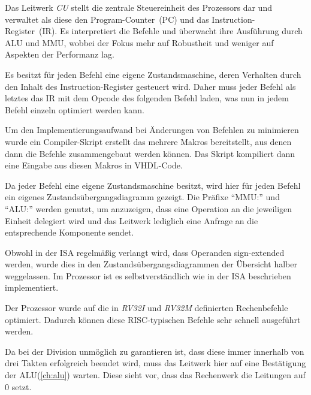 
\label{ch:cu}

Das Leitwerk \textit{CU} stellt die zentrale Steuereinheit des Prozessors dar und
verwaltet als diese den Program-Counter~(PC) und das Instruction-Register~(IR). Es
interpretiert die Befehle und \"uberwacht ihre Ausf\"uhrung durch ALU und MMU, wobbei
der Fokus mehr auf Robustheit und weniger auf Aspekten der
Performanz lag.

Es besitzt f\"ur jeden Befehl eine eigene Zustandsmaschine, deren Verhalten 
durch den Inhalt des Instruction-Register gesteuert wird. Daher muss jeder
Befehl als letztes das IR mit dem Opcode des folgenden Befehl laden, was nun
in jedem Befehl einzeln optimiert werden kann.

Um den Implementierungsaufwand bei \"Anderungen von Befehlen zu minimieren
wurde ein Compiler-Skript erstellt das mehrere Makros bereitstellt, aus denen
dann die Befehle zusammengebaut werden k\"onnen. Das Skript kompiliert dann
eine Eingabe aus diesen Makros in VHDL-Code.

Da jeder Befehl eine eigene Zustandsmaschine besitzt, wird hier f\"ur jeden
Befehl ein eigenes Zustands\-\"uber\-gangs\-dia\-gramm gezeigt. Die Pr\"afixe
``MMU:'' und ``ALU:'' werden genutzt, um anzuzeigen, dass eine Operation an die
jeweiligen Einheit delegiert wird und das Leitwerk lediglich eine Anfrage an
die entsprechende Komponente sendet.

Obwohl in der ISA regelm\"a\ss{}ig verlangt wird, dass Operanden sign-extended
werden, wurde dies in den Zustands\-\"uber\-gangs\-dia\-grammen der \"Ubersicht
halber weggelassen. Im Prozessor ist es selbstverst\"andlich wie in der ISA
beschrieben implementiert.

Der Prozessor wurde auf die in \textit{RV32I} und \textit{RV32M} definierten Rechenbefehle
optimiert. Dadurch k\"onnen diese RISC-typischen Befehle sehr schnell
ausgef\"uhrt werden.


Da bei der Division unm\"oglich zu garantieren ist, dass diese immer innerhalb
von drei Takten erfolgreich beendet wird, muss das Leitwerk hier auf eine
Best\"atigung der ALU(\ref{ch:alu}) warten. Diese sieht vor, dass das Rechenwerk
die Leitungen  auf 0 setzt.

